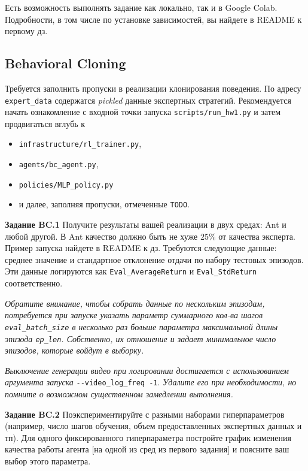 \documentclass[12pt, oneside]{article}
\begin{document}
Есть возможность выполнять задание как локально, так и в Google Colab. Подробности, в том числе по установке зависимостей, вы найдете в README к первому дз.

\subsection{Behavioral Cloning}

Требуется заполнить пропуски в реализации клонирования поведения. По адресу \verb|expert_data| содержатся \textit{pickled} данные экспертных стратегий. Рекомендуется начать ознакомление с входной точки запуска \verb|scripts/run_hw1.py| и затем продвигаться вглубь к

\begin{itemize}
    \item \verb|infrastructure/rl_trainer.py|,
    \item \verb|agents/bc_agent.py|,
    \item \verb|policies/MLP_policy.py|
    \item и далее, заполняя пропуски, отмеченные \verb|TODO|.
\end{itemize}

\textbf{Задание BC.1} Получите результаты вашей реализации в двух средах: Ant и любой другой. В Ant качество должно быть не хуже $25\%$ от качества эксперта. Пример запуска найдете в README к дз. Требуются следующие данные: среднее значение и стандартное отклонение отдачи по набору тестовых эпизодов. Эти данные логируются как \verb|Eval_AverageReturn| и \verb|Eval_StdReturn| соответственно.

\textit{Обратите внимание, чтобы собрать данные по нескольким эпизодам, потребуется при запуске указать параметр суммарного кол-ва шагов \texttt{eval\_batch\_size} в несколько раз больше параметра максимальной длины эпизода \texttt{ep\_len}. Собственно, их отношение и задает минимальное число эпизодов, которые войдут в выборку.}

\textit{Выключение генерации видео при логировании достигается с использованием аргумента запуска} \verb|--video_log_freq -1|. \textit{Удалите его при необходимости, но помните о возможном существенном замедлении выполнения.}

\textbf{Задание BC.2} Поэкспериментируйте с разными наборами гиперпараметров (например, число шагов обучения, объем предоставленных экспертных данных и тп). Для одного фиксированного гиперпараметра постройте график изменения качества работы агента [на одной из сред из первого задания] и поясните ваш выбор этого параметра.
\end{document}
